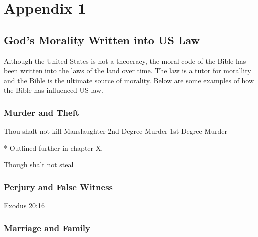 \chapter{Appendix 1}
\section{God's Morality Written into US Law}

Although the United States is not a theocracy, the moral code of the Bible has been written into the laws of the land over time. The law is a tutor for morallity and the Bible is the ultimate source of morality.
Below are some examples of how the Bible has influenced US law.

\subsection{Murder and Theft}
Thou shalt not kill
    Manslaughter
    2nd Degree Murder
    1st Degree Murder
    
* Outlined further in chapter X. 



Though shalt not steal

\subsection{Perjury and False Witness}
Exodus 20:16



\subsection{Marriage and Family}

